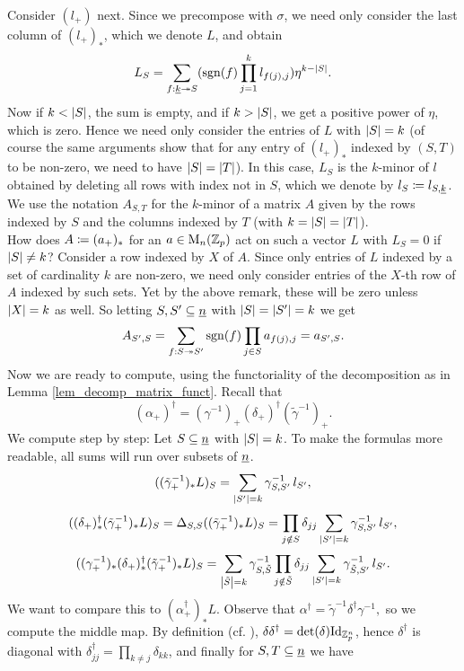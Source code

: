 \begin{rem}
Consider $(l_+)$ next. Since we precompose with $\sigma$, we need only consider the last column of $(l_+)_*$, which we denote $L$, and obtain
\[L_S = \sum_{f:\underline{k} \twoheadrightarrow S} (\operatorname{sgn}(f) \prod_{j=1}^k l_{f(j),j}) \eta^{k - \left\vert S\right\vert}.\]
Now if $k < \left\vert S\right\vert$, the sum is empty, and if $k > \left\vert S\right\vert$, we get a positive power of $\eta$, which is zero. Hence we need only consider the entries of $L$ with $\left\vert S\right\vert = k$ (of course the same arguments show that for any entry of $(l_+)_*$ indexed by $(S,T)$ to be non-zero, we need to have $\left\vert S\right\vert = \left\vert T\right\vert$). In this case, $L_S$ is the $k$-minor of $l$ obtained by deleting all rows with index not in $S$, which we denote by $l_S \coloneqq l_{S,\underline{k}}$. We use the notation $A_{S,T}$ for the $k$-minor of a matrix $A$ given by the rows indexed by $S$ and the columns indexed by $T$ (with $k=\left\vert S\right\vert=\left\vert T\right\vert$).\\
How does $A \coloneqq (a_+)_*$ for an $a \in \mathrm{M}_n(\mathbb{Z}_p)$ act on such a vector $L$ with $L_S = 0$ if $\left\vert S\right\vert \neq k$? Consider a row indexed by $X$ of $A$. Since only entries of $L$ indexed by a set of cardinality $k$ are non-zero, we need only consider entries of the $X$-th row of $A$ indexed by such sets. Yet by the above remark, these will be zero unless $\left\vert X\right\vert = k$ as well. So letting $S, S^\prime \subseteq \underline{n}$ with $\left\vert S\right\vert = \left\vert S^\prime\right\vert = k$ we get
$$A_{S^\prime,S} = \sum_{f:S \twoheadrightarrow S^\prime} \operatorname{sgn}(f) \prod_{j \in S}a_{f(j),j} = a_{S^\prime, S}.$$
Now we are ready to compute, using the functoriality of the decomposition as in Lemma \ref{lem_decomp_matrix_funct}.
Recall that $$(\alpha_+)^\dagger = (\gamma^{-1})_+ (\delta_+)^\dagger (\tilde\gamma^{-1})_+.$$ We compute step by step: Let $S \subseteq \underline{n}$ with $\left\vert S\right\vert = k$. To make the formulas more readable, all sums will run over subsets of $\underline{n}$.
$$ ( (\tilde\gamma_+^{-1})_* L )_S = \sum_{\abs{S^\prime} = k } %
		\gamma^{-1}_{S,S^\prime} \, l_{S^\prime},$$
$$ ( (\delta_+)^\dagger_* (\tilde\gamma_+^{-1})_* L )_S = \Delta_{S,S} ( (\tilde\gamma_+^{-1})_* L )_S =%
		\prod_{j \notin S} \delta_{jj} \sum_{ \abs{S^\prime} = k } \gamma^{-1}_{S,S^\prime}\, l_{S^\prime},$$
$$ ( (\gamma_+^{-1})_* (\delta_+)^\dagger_* (\tilde\gamma_+^{-1})_* L )_S = %
		\sum_{\abs{\tilde S} = k} \gamma^{-1}_{S,\tilde S} \prod_{j \notin \tilde S} \delta_{jj} \sum_{ \abs{S^\prime} = k } \gamma^{-1}_{\tilde S,S^\prime}\, l_{S^\prime}.$$
We want to compare this to $( \alpha^\dagger_+ )_* L$. Observe that
$ \alpha^\dagger = \tilde \gamma^{-1} \delta^\dagger \gamma^{-1},$ %
so we compute the middle map. By definition (cf. \cite[Definition 3.7]{carlsson2011higher}), $\delta \delta^\dagger = \det(\delta) \mathrm{Id}_{\mathbb{Z}_p^n}$, hence $\delta^\dagger$ is diagonal with $\delta^\dagger_{jj} = \prod_{k \neq j} \delta_{kk}$, and finally for $S,T \subseteq \underline{n}$ we have%

\end{rem}
